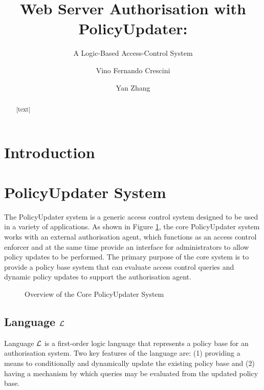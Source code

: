 \documentclass[11pt]{llncs}
\begin{document}
  \title{Web Server Authorisation with PolicyUpdater:}
  \subtitle{A Logic-Based Access-Control System}

  \author{Vino Fernando Crescini \and Yan Zhang}


  \maketitle

  \begin{abstract}
    [text]
  \end{abstract}

  \section{Introduction}

  \section{PolicyUpdater System}

    The PolicyUpdater system is a generic access control system designed to
    be used in a variety of applications. As shown in Figure \ref{fig-1},
    the core PolicyUpdater system works with an external authorisation agent,
    which functions as an access control enforcer and at the same time provide
    an interface for administrators to allow policy updates to be performed.
    The primary purpose of the core system is to provide a policy base system
    that can evaluate access control queries and dynamic policy updates to
    support the authorisation agent.

    \begin{figure}[ht]
      \begin{center}
        \caption{Overview of the Core PolicyUpdater System}
        \label{fig-1}
      \end{center}
    \end{figure}

    \subsection{Language ${\cal L}$}
      Language $\cal{L}$ is a first-order logic language that represents a
      policy base for an authorisation system. Two key features of the
      language are: (1) providing a means to conditionally and dynamically
      update  the existing policy base and (2) having a mechanism by which
      queries may be evaluated from the updated policy base.
\end{document}

